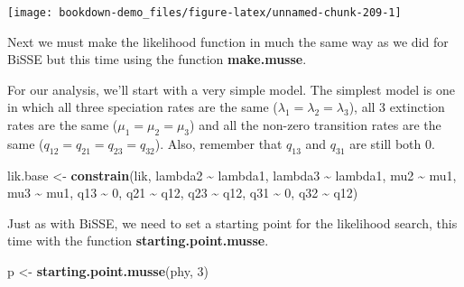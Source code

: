 \documentclass[
]{book}
\newenvironment{Shaded}{\begin{snugshade}}{\end{snugshade}}
\newcommand{\DecValTok}[1]{\textcolor[rgb]{0.00,0.00,0.81}{#1}}
\newcommand{\KeywordTok}[1]{\textcolor[rgb]{0.13,0.29,0.53}{\textbf{#1}}}
\newcommand{\NormalTok}[1]{#1}
\newcommand{\OperatorTok}[1]{\textcolor[rgb]{0.81,0.36,0.00}{\textbf{#1}}}
\newcommand{\StringTok}[1]{\textcolor[rgb]{0.31,0.60,0.02}{#1}}
\begin{document}
\begin{center}\texttt{[image: bookdown-demo\_files/figure-latex/unnamed-chunk-209-1]} \end{center}

Next we must make the likelihood function in much the same way as we did for BiSSE but this time using the function \textbf{make.musse}.

\begin{Shaded}
\end{Shaded}

For our analysis, we'll start with a very simple model. The simplest model is one in which all three speciation rates are the same (\(\lambda_{1} = \lambda_{2} = \lambda_{3}\)), all 3 extinction rates are the same (\(\mu_{1} = \mu_{2} = \mu_{3}\)) and all the non-zero transition rates are the same (\(q_{12} = q_{21} = q_{23} = q_{32}\)). Also, remember that \(q_{13}\) and \(q_{31}\) are still both 0.

\begin{Shaded}
\begin{Highlighting}[]
\NormalTok{lik.base \textless{}{-}}\StringTok{ }\KeywordTok{constrain}\NormalTok{(lik, lambda2 }\OperatorTok{\textasciitilde{}}\StringTok{ }\NormalTok{lambda1, lambda3 }\OperatorTok{\textasciitilde{}}\StringTok{ }\NormalTok{lambda1,}
\NormalTok{                      mu2 }\OperatorTok{\textasciitilde{}}\StringTok{ }\NormalTok{mu1, mu3 }\OperatorTok{\textasciitilde{}}\StringTok{ }\NormalTok{mu1,}
\NormalTok{                      q13 }\OperatorTok{\textasciitilde{}}\StringTok{ }\DecValTok{0}\NormalTok{, q21 }\OperatorTok{\textasciitilde{}}\StringTok{ }\NormalTok{q12, }
\NormalTok{                      q23 }\OperatorTok{\textasciitilde{}}\StringTok{ }\NormalTok{q12, q31 }\OperatorTok{\textasciitilde{}}\StringTok{ }\DecValTok{0}\NormalTok{, q32 }\OperatorTok{\textasciitilde{}}\StringTok{ }\NormalTok{q12)}
\end{Highlighting}
\end{Shaded}

Just as with BiSSE, we need to set a starting point for the likelihood search, this time with the function \textbf{starting.point.musse}.

\begin{Shaded}
\begin{Highlighting}[]
\NormalTok{p \textless{}{-}}\StringTok{ }\KeywordTok{starting.point.musse}\NormalTok{(phy, }\DecValTok{3}\NormalTok{)}
\end{Highlighting}
\end{Shaded}
\end{document}

